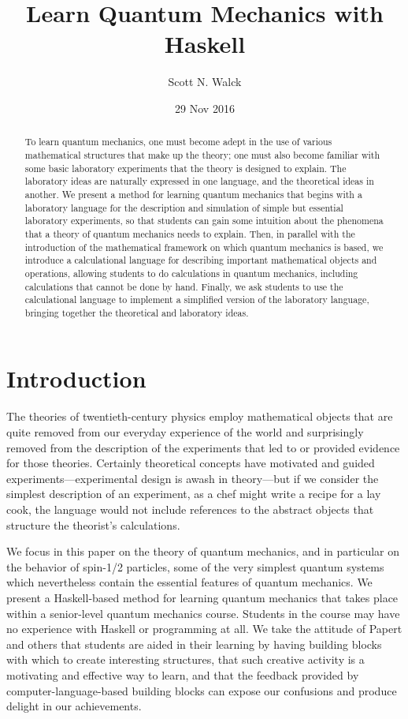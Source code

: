 \documentclass[12pt]{article}
\date{29 Nov 2016}
\title{Learn Quantum Mechanics with Haskell}
\author{Scott N. Walck
}
\begin{document}
\maketitle

\begin{abstract}
To learn quantum mechanics, one must become adept in the use
of various mathematical structures that make up the theory;
one must also become
familiar with some basic laboratory experiments that the theory is designed
to explain.
The laboratory ideas are naturally expressed in one language,
and the theoretical ideas in another.
We present a method for learning quantum mechanics that
begins with a laboratory language for the description and
simulation of simple but essential laboratory experiments,
so that students can gain some intuition about the phenomena that a theory
of quantum mechanics needs to explain.
Then, in parallel with the introduction of the mathematical
framework on which quantum mechanics is based,
we introduce a calculational language for describing
important mathematical objects and operations,
allowing students to do calculations in quantum mechanics, including
calculations that cannot be done by hand.
Finally, we ask students to use the calculational language
to implement a simplified version of the laboratory language,
bringing together the theoretical and laboratory ideas.
\end{abstract}

\section{Introduction}

The theories of twentieth-century physics employ mathematical objects
that are quite removed from our everyday experience of the world
and surprisingly removed from the description of the experiments
that led to or provided evidence for those theories.
Certainly theoretical concepts have motivated and guided
experiments---experimental design is awash in theory---but
if we consider the simplest description of an experiment,
as a chef might write a recipe for a lay cook, the language
would not include references to the abstract
objects that structure the theorist's calculations.

We focus in this paper on the theory of quantum mechanics,
and in particular on the behavior of spin-1/2 particles,
some of the very simplest quantum systems which nevertheless
contain the essential features of quantum mechanics.
We present a Haskell-based method for learning quantum mechanics that takes
place within a senior-level quantum mechanics course.
Students in the course may have no experience with Haskell
or programming at all.
We take the attitude of Papert \cite{papert}
and others \cite{sicm,sussmanFDG,alegreTFPIE2015,walck2014}
that students are aided in their learning by having
building blocks with which to create interesting structures,
that such creative activity is a motivating and effective
way to learn, and that the feedback provided by
computer-language-based building blocks can expose our
confusions and produce delight in our achievements.
\end{document}

